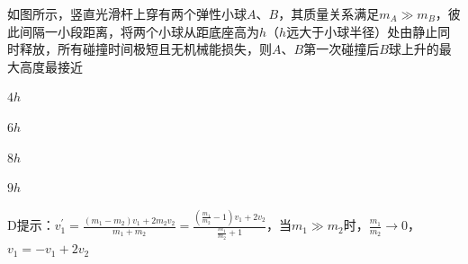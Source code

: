 如图所示，竖直光滑杆上穿有两个弹性小球\(A\)、\(B\)，其质量关系满足\(m_A \gg m_B\)，彼此间隔一小段距离，将两个小球从距底座高为\(h\)（\(h\)远大于小球半径）处由静止同时释放，所有碰撞时间极短且无机械能损失，则\(A\)、\(B\)第一次碰撞后\(B\)球上升的最大高度最接近\paren[]
	
\begin{choices}
	\item\(4h\)
	\item\(6h\)
	\item\(8h\)
	\item\(9h\)
\end{choices}
\begin{answer}
    D\qquad 提示：\(v_1^{\prime} = \frac{(m_1 - m_2)v_1 + 2m_2v_2}{m_1 + m_2} = \frac{(\frac{m_1}{m_2} - 1)v_1 + 2v_2}{\frac{m_1}{m_2} + 1}\)，当\(m_1\gg m_2\)时，\(\frac{m_1}{m_2}\to 0\)，\(v_1 = - v_1 + 2v_2\)
\end{answer}